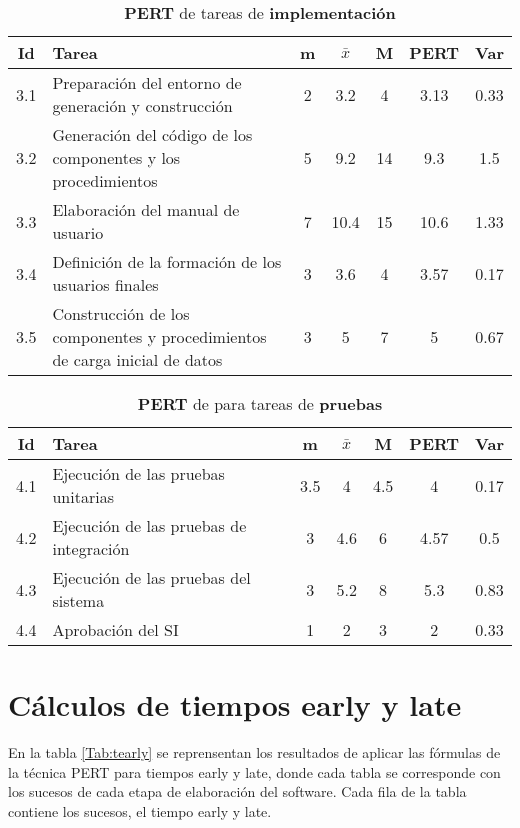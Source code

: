 \documentclass[11pt,a4paper,spanish,twoside]{report}
\begin{document}
\begin{table}[!h]
\centering
  \begin{tabular}{|c||p{5.3cm}||c|c|c||c|c|}
    \hline
    \textbf{Id} & \textbf{Tarea} & \textbf{m} & 
    \textbf{$\bar{x}$} &\textbf{M} & \textbf{PERT} & \textbf{Var}\\
    \hline \hline
    3.1 & Preparación del entorno de generación y construcción & 2 & 3.2  & 4
    & 3.13 & 0.33\\
    \hline
    3.2 & Generación del código de los componentes y los procedimientos & 5 &
    9.2 & 14 & 9.3 & 1.5\\
    \hline
    3.3 & Elaboración del manual de usuario & 7 & 10.4 & 15 & 10.6 & 1.33\\
    \hline
    3.4 & Definición de la formación de los usuarios finales & 3 & 3.6 & 4
    &3.57 & 0.17\\
    \hline
    3.5 & Construcción de los componentes y procedimientos de carga inicial
    de datos & 3 & 5 & 7 & 5 & 0.67\\
    \hline
  \end{tabular}
  \caption{\textbf{PERT} de tareas de \textbf{implementación}}
  \label{Tab:PERTimp}
\end{table}

\begin{table}[!h]
\centering
  \begin{tabular}{|c||p{5.3cm}||c|c|c||c|c|}
    \hline
    \textbf{Id} & \textbf{Tarea} & \textbf{m} & 
    \textbf{$\bar{x}$} &\textbf{M} & \textbf{PERT} & \textbf{Var}\\
    \hline \hline
    4.1 & Ejecución de las pruebas unitarias & 3.5 & 4 & 4.5 & 4 & 0.17\\
    \hline
    4.2 & Ejecución de las pruebas de integración & 3 & 4.6 & 6 & 4.57 & 0.5\\
    \hline
    4.3 & Ejecución de las pruebas del sistema & 3 & 5.2 & 8 & 5.3 & 0.83\\
    \hline
    4.4 & Aprobación del SI & 1 & 2 & 3 & 2 & 0.33\\
    \hline
  \end{tabular}
  \caption{\textbf{PERT} de para tareas de \textbf{pruebas}}
  \label{Tab:PERTpru}
\end{table}

\section{Cálculos de tiempos early y late}
En la tabla \ref{Tab:tearly} se reprensentan los resultados de aplicar las
fórmulas de la técnica PERT para tiempos early y late, donde cada tabla se
corresponde con los sucesos de cada etapa de elaboración del software. Cada
fila de la tabla contiene los sucesos, el tiempo early y late.
\end{document}

